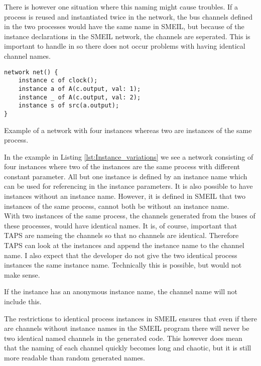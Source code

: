 There is however one situation where this naming might cause troubles. If a process is reused and instantiated twice in the network, the bus channels defined in the two processes would have the same name in SMEIL, but because of the instance declarations in the SMEIL network, the channels are seperated. This is important to handle in \cspm{} so there does not occur problems with having identical channel names.

\begin{listing}
\begin{verbatim}
network net() {
    instance c of clock();
    instance a of A(c.output, val: 1);
    instance _ of A(c.output, val: 2);
    instance s of src(a.output);
}
\end{verbatim}
\caption{Example of a network with four instances whereas two are instances of the same process.}
\label{lst:Instance_variations}
\end{listing}
In the example in Listing \ref{lst:Instance_variations} we see a network consisting of four instances where two of the instances are the same process with different constant parameter.
All but one instance is defined by an instance name which can be used for referencing in the instance parameters. It is also possible to have instances without an instance name. However, it is defined in SMEIL that two instances of the same process, cannot both be without an instance name.\\

With two instances of the same process, the \cspm{} channels generated from the buses of these processes, would have identical names. It is, of course, important that TAPS are nameing the channels so that no \cspm{} channels are identical. Therefore TAPS can look at the instances and append the instance name to the \cspm{} channel name. I also expect that the developer do not give the two identical process instances the same instance name. Technically this is possible, but would not make sense.

If the instance has an anonymous instance name, the \cspm{} channel name will not include this.

The restrictions to identical process instances in SMEIL ensures that even if there are channels without instance names in the SMEIL program there will never be two identical named \cspm{} channels in the generated code. This however does mean that the naming of each channel quickly becomes long and chaotic, but it is still more readable than random generated names.

